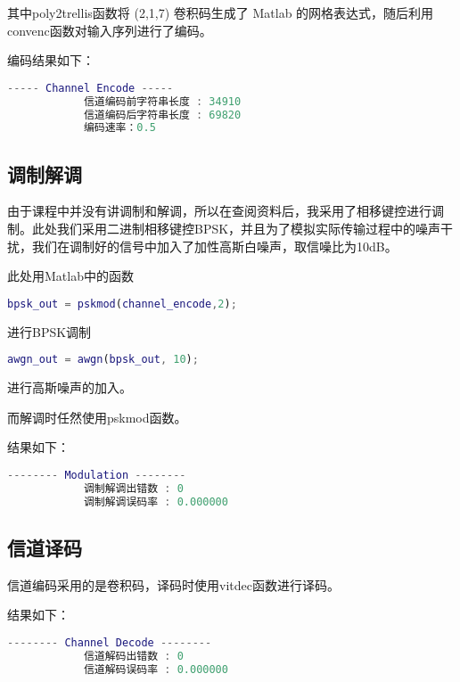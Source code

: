 \documentclass{../source/Experiment}
\begin{document}
            其中poly2trellis函数将 (2,1,7) 卷积码生成了 Matlab 的网格表达式，随后利用convenc函数对输入序列进行了编码。

            编码结果如下：
            \begin{lstlisting}[language = matlab]
            ----- Channel Encode -----
            信道编码前字符串长度 : 34910
            信道编码后字符串长度 : 69820
            编码速率：0.5
            \end{lstlisting}

        \subsection{调制解调}
            由于课程中并没有讲调制和解调，所以在查阅资料后，我采用了相移键控进行调制。此处我们采用二进制相移键控BPSK，并且为了模拟实际传输过程中的噪声干扰，我们在调制好的信号中加入了加性高斯白噪声，取信噪比为10dB。

            此处用Matlab中的函数
            \begin{lstlisting}[language = matlab]
            bpsk_out = pskmod(channel_encode,2);
            \end{lstlisting}
            进行BPSK调制
            \begin{lstlisting}[language = matlab]
            awgn_out = awgn(bpsk_out, 10);
            \end{lstlisting}
            进行高斯噪声的加入。

            而解调时任然使用pskmod函数。

            结果如下：

            \begin{lstlisting}[language = matlab]
            -------- Modulation --------
            调制解调出错数 : 0
            调制解调误码率 : 0.000000
            \end{lstlisting}

        \subsection{信道译码}
            信道编码采用的是卷积码，译码时使用vitdec函数进行译码。

            结果如下：
            \begin{lstlisting}[language = matlab]
            -------- Channel Decode --------
            信道解码出错数 : 0
            信道解码误码率 : 0.000000
            \end{lstlisting}
\end{document}
